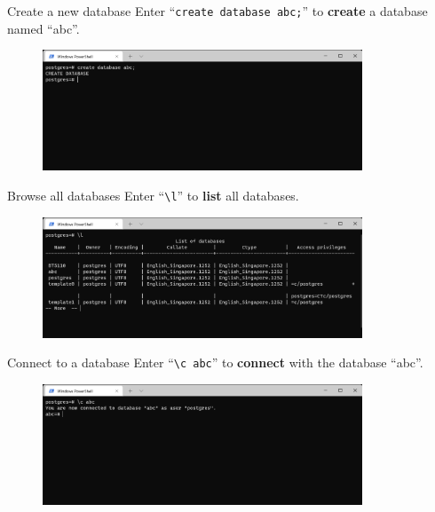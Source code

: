 \begin{frame}[fragile]{Create a new database}
	Enter ``\texttt{create database abc;}'' to \textbf{create} a database named ``abc''.
	\begin{figure}
		\includegraphics[width=0.85\textwidth]{t0-psql/images/3.png}
	\end{figure}
	
\end{frame}

\begin{frame}[fragile]{Browse all databases}
	Enter ``\texttt{\textbackslash l}'' to \textbf{list} all databases.
	\begin{figure}
		\includegraphics[width=0.85\textwidth]{t0-psql/images/2.png}
	\end{figure}
	
\end{frame}

\begin{frame}[fragile]{Connect to a database}
	Enter ``\texttt{\textbackslash c abc}'' to \textbf{connect} with the database ``abc''.
	\begin{figure}
		\includegraphics[width=0.85\textwidth]{t0-psql/images/4.png}
	\end{figure}
	
\end{frame}

